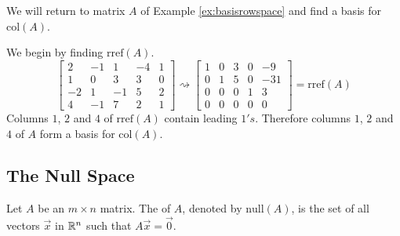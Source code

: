 \documentclass{ximera}
\begin{document}
\begin{example}\label{ex:basiscolspace}
We will return to matrix $A$ of Example \ref{ex:basisrowspace} and find a basis for $\mbox{col}(A)$.
\begin{explanation}
We begin by finding $\mbox{rref}(A)$.
$$\begin{bmatrix}2&-1&1&-4&1\\1&0&3&3&0\\-2&1&-1&5&2\\4&-1&7&2&1\end{bmatrix}\rightsquigarrow\begin{bmatrix}1&0&3&0&-9\\0&1&5&0&-31\\0&0&0&1&3\\0&0&0&0&0\end{bmatrix}=\mbox{rref}(A)$$
Columns $1$, $2$ and $4$ of $\mbox{rref}(A)$ contain leading $1's$.  Therefore columns $1$, $2$ and $4$ of $A$ form a basis for $\mbox{col}(A)$.
\end{explanation}

\end{example}

\subsection*{The Null Space}
\begin{definition}\label{def:nullspace} Let $A$ be an $m\times n$ matrix.  The  of $A$, denoted by $\mbox{null}(A)$, is the set of all vectors $\vec{x}$ in $\mathbb{R}^n$ such that $A\vec{x}=\vec{0}$.
\end{definition}
\end{document}
